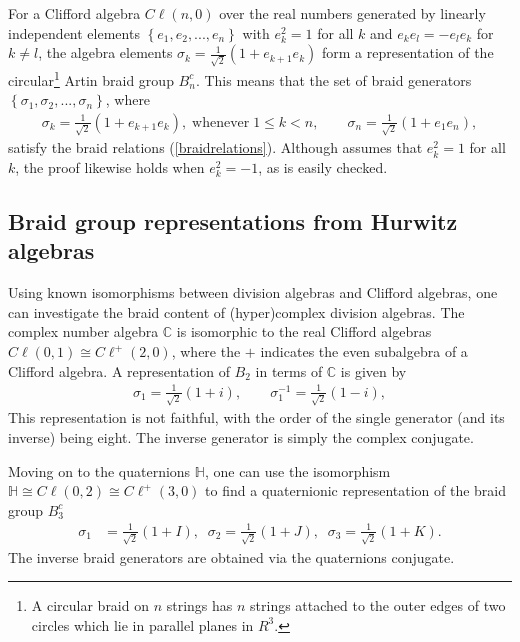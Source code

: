 \documentclass[a4paper]{jpconf}
\begin{document}
For a Clifford algebra $C\ell(n,0)$ over the real numbers generated by linearly independent elements $\left\lbrace e_1,e_2,...,e_n\right\rbrace $ with $e_k^2= 1$ for all $k$ and $e_ke_l=-e_le_k$ for $k\neq l$, the algebra elements $\sigma_k=\frac{1}{\sqrt{2}}(1+e_{k+1}e_k)$ form a representation of the circular\footnote{A circular braid on $n$ strings has $n$ strings attached to the outer edges of two circles which lie in parallel planes in $R^3$.} Artin braid group $B^c_n$. This means that the set of braid generators $\left\lbrace  \sigma_1,\sigma_2,...,\sigma_n\right\rbrace $, where
\begin{eqnarray}
\sigma_k = \frac{1}{\sqrt{2}}(1+e_{k+1}e_k),\;\textrm{whenever}\; 1\leq k <n,\qquad
\sigma_n =\frac{1}{\sqrt{2}}(1+e_1e_n),
\end{eqnarray}
satisfy the braid relations (\ref{braidrelations}). Although \cite{kauffman2016braiding} assumes that $e_k^2=1$ for all $k$, the proof likewise holds when $e_k^2=-1$, as is easily checked. 

\subsection{Braid group representations from Hurwitz algebras}

Using known isomorphisms between division algebras and Clifford algebras, one can investigate the braid content of (hyper)complex division algebras. The complex number algebra $\mathbb{C}$ is isomorphic to the real Clifford algebras $C\ell(0,1)\cong C\ell^+(2,0)$, where the $+$ indicates the even subalgebra of a Clifford algebra. A representation of $B_2$ in terms of $\mathbb{C}$ is given by
\begin{eqnarray}\label{complexgenerators}
\sigma_1=\frac{1}{\sqrt{2}}(1+i),\qquad \sigma_1^{-1}=\frac{1}{\sqrt{2}}(1-i),
\end{eqnarray} 
This representation is not faithful, with the order of the single generator (and its inverse) being eight. The inverse generator is simply the complex conjugate.

Moving on to the quaternions $\mathbb{H}$, one can use the isomorphism $\mathbb{H}\cong C\ell(0,2)\cong C\ell^+(3,0)$ to find a quaternionic representation of the braid group $B^c_3$
\begin{eqnarray}\label{quaterniongenerators}
\sigma_1&=\frac{1}{\sqrt{2}}(1+I),\;\;\sigma_2=\frac{1}{\sqrt{2}}(1+J),\;\;\sigma_3=\frac{1}{\sqrt{2}}(1+K).
\end{eqnarray}
The inverse braid generators are obtained via the quaternions conjugate.
\end{document}
